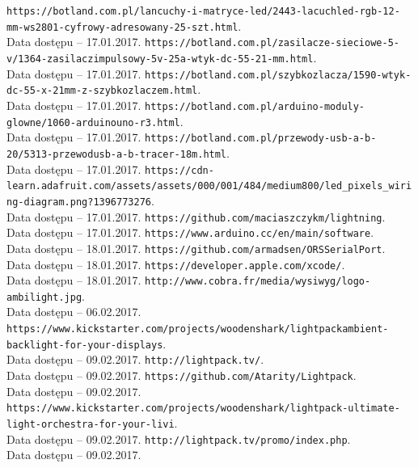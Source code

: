 \documentclass[12pt]{report}
\begin{document}
\begin{thebibliography}{99}
 {\tt https://botland.com.pl/lancuchy-i-matryce-led/2443-lacuch\-led-rgb-12-mm-ws2801-cyfrowy-adresowany-25-szt.html}.\\Data dostępu -- 17.01.2017.
 {\tt https://botland.com.pl/zasilacze-sieciowe-5-v/1364-zasilacz\-impulsowy-5v-25a-wtyk-dc-55-21-mm.html}.\\Data dostępu -- 17.01.2017.
 {\tt https://botland.com.pl/szybkozlacza/1590-wtyk-dc-55-x-21\-mm-z-szybkozlaczem.html}.\\Data dostępu -- 17.01.2017.
 {\tt https://botland.com.pl/arduino-moduly-glowne/1060-arduino\-uno-r3.html}.\\Data dostępu -- 17.01.2017.
 {\tt https://botland.com.pl/przewody-usb-a-b-20/5313-przewod\-usb-a-b-tracer-18m.html}.\\Data dostępu -- 17.01.2017.
 {\tt https://cdn-learn.adafruit.com/assets/assets/000/001/484/\-medium800/led\_pixels\_wiring-diagram.png?1396773276}.\\Data dostępu -- 17.01.2017.
 {\tt https://github.com/maciaszczykm/lightning}.\\Data dostępu -- 17.01.2017.
 {\tt https://www.arduino.cc/en/main/software}.\\Data dostępu -- 18.01.2017.
 {\tt https://github.com/armadsen/ORSSerialPort}.\\Data dostępu -- 18.01.2017.
 {\tt https://developer.apple.com/xcode/}.\\Data dostępu -- 18.01.2017.
 {\tt http://www.cobra.fr/media/wysiwyg/logo-ambilight.jpg}. \\Data dostępu -- 06.02.2017.
 {\tt https://www.kickstarter.com/projects/woodenshark/lightpack\-ambient-backlight-for-your-displays}. \\Data dostępu -- 09.02.2017.
 {\tt http://lightpack.tv/}. \\Data dostępu -- 09.02.2017.
 {\tt https://github.com/Atarity/Lightpack}. \\Data dostępu -- 09.02.2017.
 {\tt https://www.kickstarter.com/projects/woodenshark/lightpack-ultimate-light-orchestra-for-your-livi}. \\Data dostępu -- 09.02.2017.
 {\tt http://lightpack.tv/promo/index.php}. \\Data dostępu -- 09.02.2017.

\end{thebibliography}

\listoffigures

\listoftables

\lstlistoflistings
\end{document}
